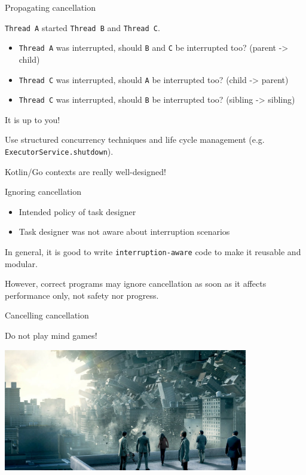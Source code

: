 \begin{frame}{Propagating cancellation}

\texttt{Thread A} started \texttt{Thread B} and \texttt{Thread C}.

\begin{itemize}
    \item \texttt{Thread A} was interrupted, should \texttt{B} and \texttt{C} be interrupted too? (parent -> child)
    \item \texttt{Thread C} was interrupted, should \texttt{A} be interrupted too? (child -> parent)
    \item \texttt{Thread C} was interrupted, should \texttt{B} be interrupted too? (sibling -> sibling)
\end{itemize}

\pause

It is up to you!

Use structured concurrency techniques and life cycle management (e.g. \texttt{ExecutorService.shutdown}). 

\pause

Kotlin/Go contexts are really well-designed!

\end{frame}

\begin{frame}{Ignoring cancellation}

\begin{itemize}
    \item Intended policy of task designer
    \item Task designer was not aware about interruption scenarios
\end{itemize}

\pause

In general, it is good to write \texttt{interruption-aware} code to make it reusable and modular.

\pause 

However, correct programs may ignore cancellation as soon as it affects performance only, not safety nor progress.
\end{frame}

\begin{frame}[fragile]{Cancelling cancellation}

\pause 

Do not play mind games!

\pause

\begin{center}
\includegraphics[width=0.8\textwidth]{./pics/inception.png}
\end{center}

\end{frame}



